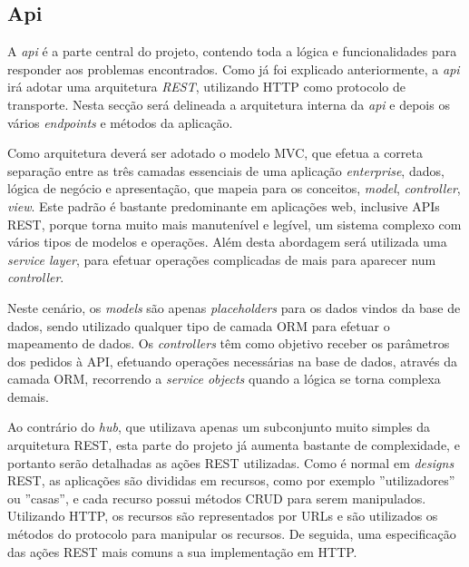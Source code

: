 \subsection{Api}

A \textit{api} é a parte central do projeto, contendo toda a lógica e funcionalidades para responder aos problemas encontrados. Como já foi explicado anteriormente, a \textit{api} irá adotar uma arquitetura \textit{REST}, utilizando HTTP como protocolo de transporte. Nesta secção será delineada a arquitetura interna da \textit{api} e depois os vários \textit{endpoints} e métodos da aplicação.

Como arquitetura deverá ser adotado o modelo MVC, que efetua a correta separação entre as três camadas essenciais de uma aplicação \textit{enterprise}, dados, lógica de negócio e apresentação, que mapeia para os conceitos, \textit{model}, \textit{controller}, \textit{view}. Este padrão é bastante predominante em aplicações web, inclusive APIs REST, porque torna muito mais manutenível e legível, um sistema complexo com vários tipos de modelos e operações. Além desta abordagem será utilizada uma \textit{service layer}, para efetuar operações complicadas de mais para aparecer num \textit{controller}.

Neste cenário, os \textit{models} são apenas \textit{placeholders} para os dados vindos da base de dados, sendo utilizado qualquer tipo de camada ORM para efetuar o mapeamento de dados. Os \textit{controllers} têm como objetivo receber os parâmetros dos pedidos à API, efetuando operações necessárias na base de dados, através da camada ORM, recorrendo a \textit{service objects} quando a lógica se torna complexa demais.

Ao contrário do \textit{hub}, que utilizava apenas um subconjunto muito simples da arquitetura REST, esta parte do projeto já aumenta bastante de complexidade, e portanto serão detalhadas as ações REST utilizadas.
Como é normal em \textit{designs} REST, as aplicações são divididas em recursos, como por exemplo ''utilizadores'' ou ''casas'', e cada recurso possui métodos CRUD para serem manipulados. Utilizando HTTP, os recursos são representados por URLs e são utilizados os métodos do protocolo para manipular os recursos. De seguida, uma especificação das ações REST mais comuns a sua implementação em HTTP.

